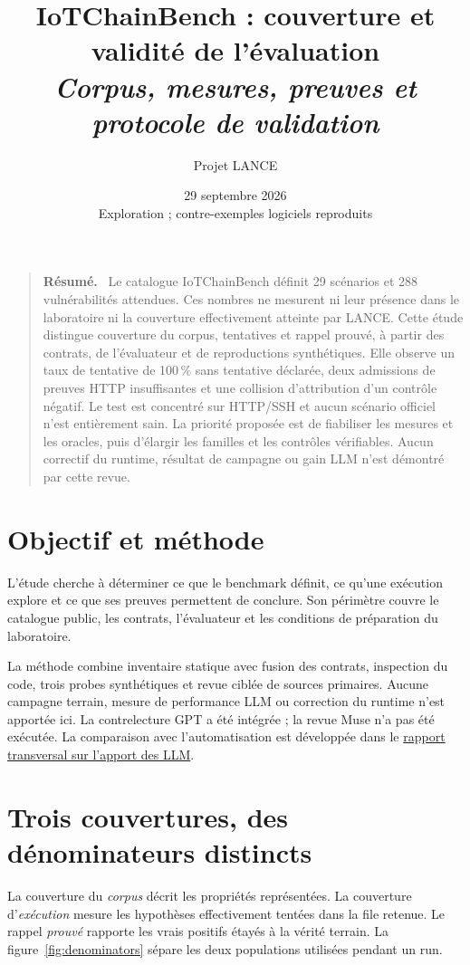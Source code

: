 \documentclass[11pt,a4paper]{article}
\title{\bfseries IoTChainBench : couverture et validité de l'évaluation\\[0.5em]\large\mdseries\itshape Corpus, mesures, preuves et protocole de validation}
\author{Projet LANCE}
\date{29 septembre 2026\\[0.4em]\small Exploration ; contre-exemples logiciels reproduits}
\renewenvironment{abstract}
  {\begin{quote}\small\noindent\textbf{Résumé.}\ }
  {\par\end{quote}}
\begin{document}
\maketitle
\begin{abstract}
Le catalogue IoTChainBench définit 29 scénarios et 288 vulnérabilités attendues. Ces nombres ne mesurent ni leur présence dans le laboratoire ni la couverture effectivement atteinte par LANCE. Cette étude distingue couverture du corpus, tentatives et rappel prouvé, à partir des contrats, de l'évaluateur et de reproductions synthétiques. Elle observe un taux de tentative de 100\,\% sans tentative déclarée, deux admissions de preuves HTTP insuffisantes et une collision d'attribution d'un contrôle négatif. Le test est concentré sur HTTP/SSH et aucun scénario officiel n'est entièrement sain. La priorité proposée est de fiabiliser les mesures et les oracles, puis d'élargir les familles et les contrôles vérifiables. Aucun correctif du runtime, résultat de campagne ou gain LLM n'est démontré par cette revue.
\end{abstract}
\clearpage

\begingroup
\small
\tableofcontents
\endgroup
\clearpage

\section{Objectif et méthode}
L'étude cherche à déterminer ce que le benchmark définit, ce qu'une exécution
explore et ce que ses preuves permettent de conclure. Son périmètre couvre le
catalogue public, les contrats, l'évaluateur et les conditions de préparation
du laboratoire.

La méthode combine inventaire statique avec fusion des contrats, inspection du
code, trois probes synthétiques et revue ciblée de sources primaires.
Aucune campagne terrain, mesure de performance LLM ou correction du runtime
n'est apportée ici. La contrelecture GPT a été intégrée ; la revue Muse n'a pas
été exécutée. La comparaison avec l'automatisation est développée dans le
\href{../agent-vs-automation/report.pdf}{rapport transversal sur l'apport des LLM}.

\section{Trois couvertures, des dénominateurs distincts}
\label{sec:denominators}
La couverture du \emph{corpus} décrit les propriétés représentées. La couverture d'\emph{exécution} mesure les hypothèses effectivement tentées dans la file retenue. Le rappel \emph{prouvé} rapporte les vrais positifs étayés à la vérité terrain. La figure~\ref{fig:denominators} sépare les deux populations utilisées pendant un run.
\end{document}

